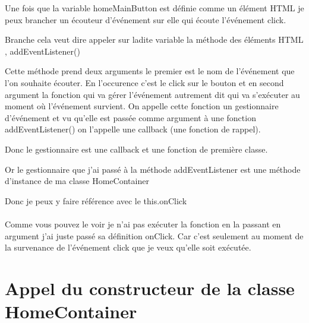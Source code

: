 \documentclass[a4paper, 12pt]{report}
\begin{document}
Une fois que la variable homeMainButton est définie comme un élément HTML je peux brancher un écouteur d'événement sur elle qui écoute l'événement click.

Branche cela veut dire appeler sur ladite variable la méthode des éléments HTML , addEventListener()

Cette méthode prend deux arguments le premier est le nom de l'événement que l'on souhaite écouter. En l'occurence c'est le click sur le bouton et en second argument la fonction qui va gérer l'événement autrement dit qui va s'exécuter au moment où l'événement survient. On appelle cette fonction un gestionnaire d'événement et vu qu'elle est passée comme argument à une fonction addEventListener() on l'appelle une callback (une fonction de rappel).

Donc le gestionnaire est une callback et une fonction de première classe. 

Or le gestionnaire que j'ai passé à la méthode addEventListener est une méthode d'instance de ma classe HomeContainer 

Donc je peux y faire référence avec le this.onClick


\paragraph{}

Comme vous pouvez le voir je n'ai pas exécuter la fonction en la passant en argument j'ai juste passé sa définition onClick. Car c'est seulement au moment de la survenance de l'événement click que je veux qu'elle soit exécutée.


\section[short]{Appel du constructeur de la classe HomeContainer}
\end{document}
